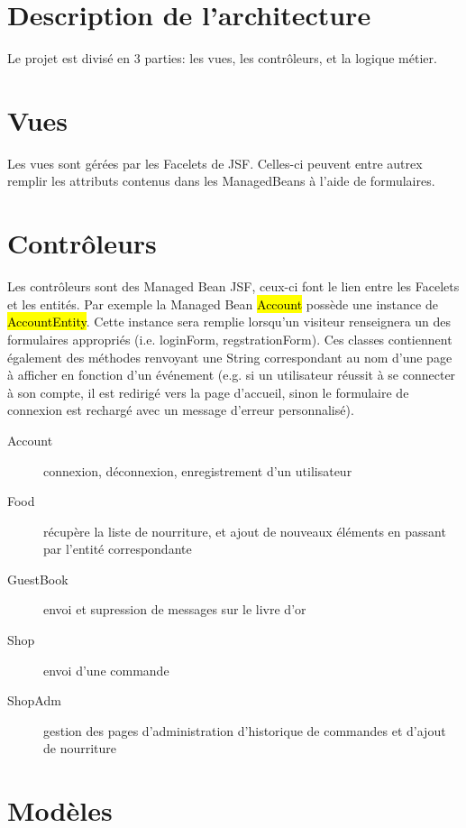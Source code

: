 \section{Description de l'architecture}

Le projet est divisé en 3 parties: les vues, les contrôleurs, et la logique
métier.\\

\section{Vues}

Les vues sont gérées par les Facelets de JSF. Celles-ci peuvent entre autrex
remplir les attributs contenus dans les ManagedBeans à l'aide de formulaires.

\section{Contrôleurs}

Les contrôleurs sont des Managed Bean JSF, ceux-ci font le lien entre les
Facelets et les entités. Par exemple la Managed Bean \hl{Account} possède une
instance de \hl{AccountEntity}. Cette instance sera remplie lorsqu'un visiteur
renseignera un des formulaires appropriés (i.e. loginForm, regstrationForm).
Ces classes contiennent également des méthodes renvoyant une String correspondant
au nom d'une page à afficher en fonction d'un événement (e.g. si un utilisateur
réussit à se connecter à son compte, il est redirigé vers la page d'accueil,
sinon le formulaire de connexion est rechargé avec un message d'erreur
personnalisé).\\

\begin{description}
    \item[Account] connexion, déconnexion, enregistrement d'un utilisateur
    \item[Food] récupère la liste de nourriture, et ajout de nouveaux éléments
    en passant par l'entité correspondante
    \item[GuestBook] envoi et supression de messages sur le livre d'or
    \item[Shop] envoi d'une commande
    \item[ShopAdm] gestion des pages d'administration d'historique de commandes
    et d'ajout de nourriture
\end{description}

\section{Modèles}

